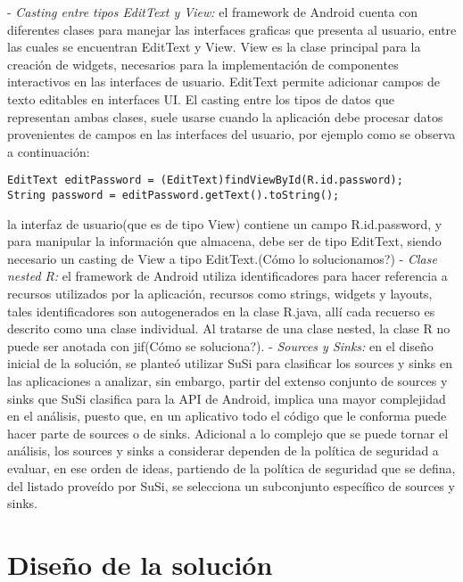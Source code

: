 - \textit{Casting entre tipos EditText y View:}\newline
el framework de Android cuenta con diferentes clases para manejar las interfaces
graficas que presenta al usuario, entre las cuales se encuentran EditText y
View. View es la clase principal para la creación de widgets, necesarios para la
implementación de componentes interactivos en las interfaces de usuario.
EditText permite adicionar campos de texto editables en interfaces UI. El
casting entre los tipos de datos que representan ambas clases, suele usarse
cuando la aplicación debe procesar datos provenientes de campos en las
interfaces del usuario, por ejemplo como se observa a continuación:
\begin{lstlisting}
EditText editPassword = (EditText)findViewById(R.id.password);
String password = editPassword.getText().toString();
\end{lstlisting}
la interfaz de usuario(que es de tipo View) contiene un campo R.id.password, y
para manipular la información que almacena, debe ser de tipo EditText, siendo
necesario un casting de View a tipo EditText.(Cómo lo solucionamos?)\newline
- \textit{Clase nested R:}\newline
el framework de Android utiliza identificadores para hacer referencia a recursos
utilizados por la aplicación, recursos como strings, widgets y layouts, tales
identificadores son autogenerados en la clase R.java, allí cada recuerso es
descrito como una clase individual. Al tratarse de una clase nested, la clase R
no puede ser anotada con jif(Cómo se soluciona?).\newline 
- \textit{Sources y Sinks:}\newline
en el diseño inicial de la solución, se
planteó utilizar SuSi para clasificar los sources y sinks en las aplicaciones a analizar, sin embargo,
partir del extenso conjunto de sources y sinks que SuSi clasifica para la API de
Android, implica una mayor complejidad en el análisis, puesto que, en un
aplicativo todo el código que le conforma puede hacer parte de sources o de
sinks. Adicional a lo complejo que se puede tornar el análisis, los sources y
sinks a considerar dependen de la política de seguridad a evaluar, en ese orden
de ideas, partiendo de la política de seguridad que se defina, del listado
proveído por SuSi, se selecciona un subconjunto específico de sources y sinks.\newline 

\section{Diseño de la solución} 
